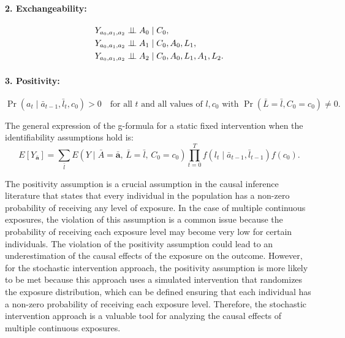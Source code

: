 \paragraph{2. Exchangeability:}
\begin{align*}
    Y_{a_0, a_1, a_2} &\independent A_0 \mid C_0, \\
    Y_{a_0, a_1, a_2} &\independent A_1 \mid C_0, A_0, L_1, \\
    Y_{a_0, a_1, a_2} &\independent A_2 \mid C_0, A_0, L_1, A_1, L_2.
\end{align*}

\paragraph{3. Positivity:}
\begin{equation*}
    \Pr(a_t \mid \bar{a}_{t-1}, \bar{l}_t, c_0) > 0 \quad \text{for all } t \text{ and all values of } l, c_0 \text{ with } \Pr(\bar{L} = \bar{l}, C_0 = c_0) \neq 0.
\end{equation*}

The general expression of the g-formula for a static fixed intervention when the identifiability assumptions hold is:
\begin{equation}
    E\!\left[Y_{\bar{\mathbf{a}}}\right] = \sum_{\bar{l}} E\!\left(Y \mid \bar{A} = \bar{\mathbf{a}},\, \bar{L} = \bar{l},\, C_0 = c_0\right) \prod_{t=0}^{T} f\!\left(l_t \mid \bar{a}_{t-1}, \bar{l}_{t-1}\right) f(c_0).
    \label{eq:gformula}
\end{equation}

The positivity assumption is a crucial assumption in the causal inference literature that states that every individual in the population has a non-zero probability of receiving any level of exposure. In the case of multiple continuous exposures, the violation of this assumption is a common issue because the probability of receiving each exposure level may become very low for certain individuals. The violation of the positivity assumption could lead to an underestimation of the causal effects of the exposure on the outcome.\cite{petersen_positivity_2012} However, for the stochastic intervention approach, the positivity assumption is more likely to be met because this approach uses a simulated intervention that randomizes the exposure distribution, which can be defined ensuring that each individual has a non-zero probability of receiving each exposure level. Therefore, the stochastic intervention approach is a valuable tool for analyzing the causal effects of multiple continuous exposures.

